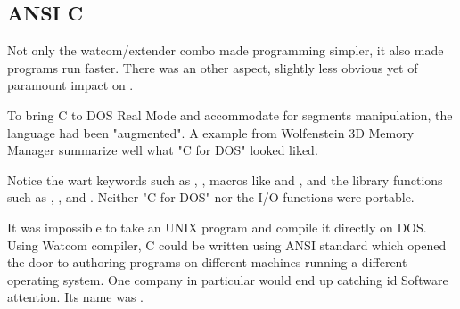 \subsection{ANSI C}
Not only the watcom/extender combo made programming simpler, it also made programs run faster. There was an other aspect, slightly less obvious yet of paramount impact on \doom.\\
\par
To bring C to DOS Real Mode and accommodate for segments manipulation, the language had been "augmented". A example from Wolfenstein 3D Memory Manager summarize well what "C for DOS" looked liked.\\
\par
{}
\par
Notice the wart keywords such as , , macros like  and , and the  library functions such as , , and . Neither "C for DOS" nor the I/O functions were portable.\\
\par
 It was impossible to take an UNIX program and compile it directly on DOS. Using Watcom compiler, C could be written using ANSI standard which opened the door to authoring programs on different machines running a different operating system. One company in particular would end up catching id Software attention. Its name was \NeXT.
